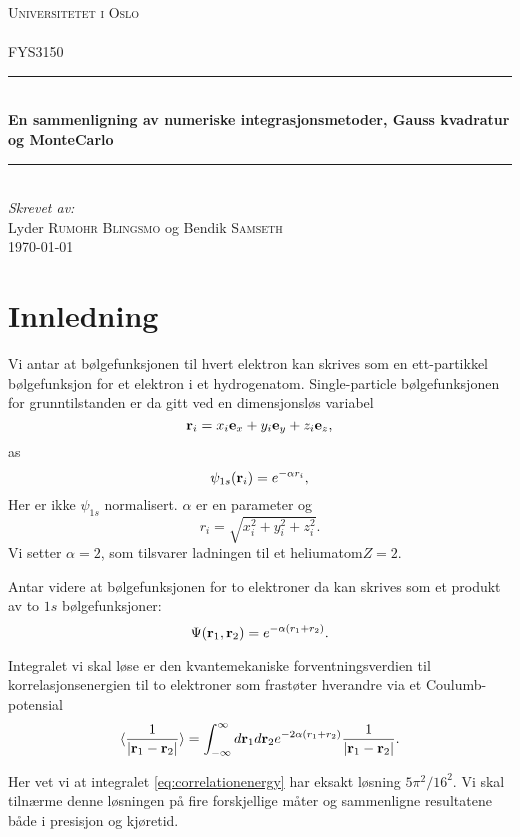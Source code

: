 \documentclass[11pt]{article}
\begin{document}
\begin{titlepage}
  \newcommand{\HRule}{\rule{\linewidth}{0.5mm}}
  \center
  \textsc{\LARGE Universitetet i Oslo}\\[1.5cm] %
  \textsc{\Large }\\[0.5cm] %
  \textsc{\large FYS3150}\\[0.5cm] %
  \HRule \\[0.4cm]
  { \huge \bfseries En sammenligning av numeriske integrasjonsmetoder, Gauss kvadratur og MonteCarlo}\\[0.4cm] %
  \HRule \\[1.5cm]
  \Large \emph{Skrevet av:}\\
  Lyder \textsc{Rumohr Blingsmo} og Bendik \textsc{Samseth}\\[3cm]
  {\large \today}\\[3cm]
  \vfill
\end{titlepage}

\section{Innledning}

Vi antar at bølgefunksjonen til hvert elektron kan skrives som en ett-partikkel
bølgefunksjon for et elektron i et hydrogenatom. Single-particle bølgefunksjonen for 
grunntilstanden er da gitt ved en dimensjonsløs variabel
\[
   {\bf r}_i =  x_i {\bf e}_x + y_i {\bf e}_y +z_i {\bf e}_z ,
\]
as
\[
   \psi_{1s}({\bf r}_i)  =   e^{-\alpha r_i},
\]
Her er ikke $\psi_{1s}$ normalisert. $\alpha$ er en parameter og
\[
r_i = \sqrt{x_i^2+y_i^2+z_i^2}.
\]
Vi setter $\alpha=2$, som tilsvarer ladningen til et heliumatom$Z=2$. 

Antar videre at bølgefunksjonen for to elektroner da kan skrives som et produkt av
to $1s$ bølgefunksjoner:
\[
   \Psi({\bf r}_1,{\bf r}_2)  =   e^{-\alpha (r_1+r_2)}.
\]

Integralet vi skal løse er den kvantemekaniske forventningsverdien
til korrelasjonsenergien til to elektroner som frastøter hverandre via et Coulumb-potensial
\begin{equation}\label{eq:correlationenergy}
   \langle \frac{1}{|{\bf r}_1-{\bf r}_2|} \rangle =
   \int_{-\infty}^{\infty} d{\bf r}_1d{\bf r}_2  e^{-2\alpha (r_1+r_2)}\frac{1}{|{\bf r}_1-{\bf r}_2|}.
\end{equation}

Her vet vi at integralet \eqref{eq:correlationenergy} har eksakt løsning $5\pi^2/16^2$. Vi skal tilnærme denne 
løsningen på fire forskjellige måter og sammenligne resultatene både i presisjon og kjøretid.




\printbibliography
\end{document}
